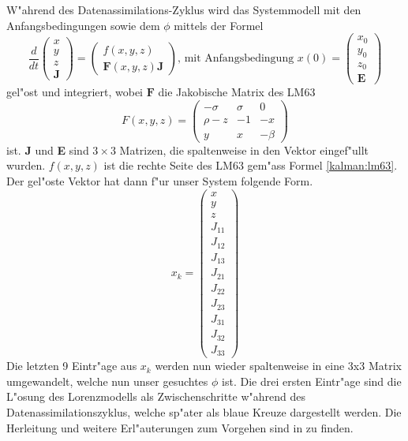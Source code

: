 \begin{refsection}
W"ahrend des Datenassimilations-Zyklus wird das Systemmodell mit den Anfangsbedingungen sowie dem $\phi$ mittels der Formel
\[
\frac{d}{dt}\begin{pmatrix}
x \\ 
y \\ 
z \\ 
\textbf{J}
\end{pmatrix}=
\begin{pmatrix}
f(x,y,z) \\ 
\textbf{F}(x,y,z)\textbf{J}
\end{pmatrix} 
\text{, mit Anfangsbedingung }
x(0)=\begin{pmatrix}
x_{0}\\
y_{0}\\
z_{0}\\ 
\textbf{E}
\end{pmatrix} 
\]
gel"ost und integriert, wobei $\textbf{F}$ die Jakobische Matrix des LM63 
\[
F(x,y,z) = \begin{pmatrix}
-\sigma & \sigma & 0 \\ 
\rho-z & -1 & -x \\ 
y & x & -\beta
\end{pmatrix} 
\]
ist. \textbf{J} und \textbf{E} sind $3\times3$ Matrizen, die spaltenweise in den Vektor eingef"ullt wurden. $f(x,y,z)$ ist die rechte Seite des LM63 gem"ass Formel \eqref{kalman:lm63}. Der gel"oste Vektor hat dann f"ur unser System folgende Form.
\[
x_{k}=\begin{pmatrix}
x \\ 
y \\ 
z \\  
J_{11} \\ 
J_{12} \\ 
J_{13} \\ 
J_{21} \\ 
J_{22} \\ 
J_{23} \\ 
J_{31} \\ 
J_{32} \\
J_{33} 
\end{pmatrix}
\]
Die letzten 9 Eintr"age aus $x_{k}$ werden nun wieder spaltenweise in eine 3x3 Matrix umgewandelt, welche nun unser gesuchtes $\phi$ ist. Die drei ersten Eintr"age sind die L"osung des Lorenzmodells als Zwischenschritte w"ahrend des Datenassimilationszyklus, welche sp"ater als blaue Kreuze dargestellt werden. Die Herleitung und weitere Erl"auterungen zum Vorgehen sind in \cite{skript:DiffGl} zu finden.\\


\end{refsection}
